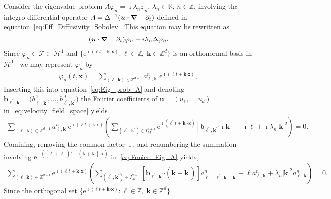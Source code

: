 \documentclass[leqno,onefignum,onetabnum]{siamltex1213}
\newcommand{\e}{\mathrm{e}}
\newcommand{\Hs}{\mathscr{H}}
\newcommand{\Fs}{\mathscr{F}}
\newcommand\bnabla{\mbox{\boldmath${\nabla}$}}
\providecommand\bcdot{\boldsymbol{\cdot}}
\newcommand{\vecb}{\boldsymbol{b}}
\newcommand{\vecx}{\boldsymbol{x}}
\newcommand{\vecu}{\boldsymbol{u}}
\newcommand{\veck}{\boldsymbol{k}}
\begin{document}
Consider the eigenvalue problem $A\varphi_n=\imath\lambda_n\varphi_n$, $\lambda_n\in\mathbb{R}$,
$n\in\mathbb{Z}$, involving the integro-differential operator 
$A=\Delta^{-1}(\vecu \bcdot\bnabla -\partial_t)$ defined in
equation~\eqref{eq:Eff_Diffusivity_Sobolev}. This equation may be
rewritten as       
%
\begin{align}\label{eq:Eig_prob_A}
  (\vecu \bcdot\bnabla -\partial_t)\varphi_n=\imath\lambda_n\Delta\varphi_n.
\end{align}
%
Since $\varphi_n\in\Fs\subset\Hs^1$ and
$\{\e^{\imath(\ell t+\veck\bcdot\vecx)}:\ell\in\mathbb{Z},\;\veck\in\mathbb{Z}^d\}$ 
is an orthonormal basis in $\Hs^1$~\cite{Folland:99:RealAnalysis} we may represent
$\varphi_n$ by
% 
\begin{align}\label{eq:Fourier_Eig_fun}
  \varphi_n(t,\vecx)=\sum_{(\ell,\veck)\in\mathbb{Z}^{d+1}}a^n_{\ell,\veck}\;\e^{\imath(\ell t+\veck\bcdot\vecx)},
\end{align}
%
Inserting this into equation~\eqref{eq:Eig_prob_A} and denoting 
$\vecb_{\ell^\prime,\veck}=\big(b^{\,1}_{\ell^\prime,\veck^\prime},\ldots,b^{\,d}_{\ell^\prime,\veck^\prime}\big)$
the Fourier coefficients of $\vecu =(u_1,\ldots,u_d)$
in~\eqref{eq:velocity_field_space} yields    
%
\begin{align}\label{eq:Fouier_Eig_A}
  \sum_{(\ell,\veck)\in\mathbb{Z}^{d+1}
  }a^n_{\ell,\veck}\;\e^{\imath(\ell t+\veck\bcdot\vecx)}
  \left(
    \sum_{(\ell^\prime,\veck^\prime)\in I_M^{d+1}}\e^{\imath(\ell^\prime t+\veck^\prime\bcdot\vecx)}
  \left[\vecb_{\ell^\prime,\veck^\prime}\bcdot\imath\veck
       \right]
  -\imath\ell
  +\imath\lambda_n|\veck|^2\right)=0.
\end{align}
%
Comining, removing the common factor $\imath$, and renumbering the summation
involving $\e^{\imath((\ell+\ell^\prime)t+(\veck+\veck^\prime)\bcdot\vecx)}$
in~\eqref{eq:Fouier_Eig_A} yields, 
%
\begin{align}\label{eq:Fouier_Eig_A_resum}
  \sum_{(\ell,\veck)\in\mathbb{Z}^{d+1}}\e^{\imath(\ell t+\veck\bcdot\vecx)}
  \left(
    \sum_{(\ell^\prime,\veck^\prime)\in I_M^{d+1}}
  \left[\vecb_{\ell^\prime,\veck^\prime}\bcdot(\veck-\veck^\prime)
       \right]a^n_{\ell-\ell^\prime,\veck-\veck^\prime}
  -\ell a^n_{\ell,\veck}
  +\lambda_n|\veck|^2a^n_{\ell,\veck}\right)=0.
\end{align}
%
Since the orthogonal set
$\{\e^{\imath(\ell t+\veck\bcdot\vecx)}:\ell\in\mathbb{Z},\;\veck\in\mathbb{Z}^d\}$
\end{document}
